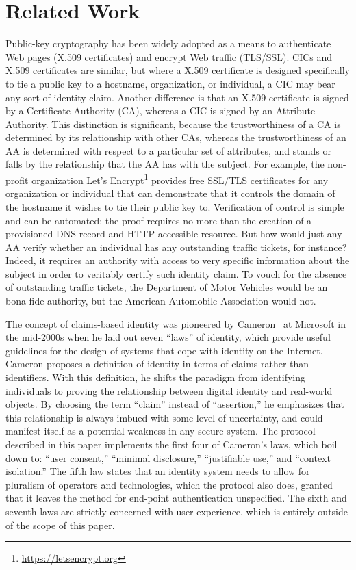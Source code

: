 \documentclass[conference]{IEEEtran}
\begin{document}
\section{Related Work}
Public-key cryptography has been widely adopted as a means to authenticate Web pages (X.509 certificates) and encrypt Web traffic (TLS/SSL). CICs and X.509 certificates are similar, but where a X.509 certificate is designed specifically to tie a public key to a hostname, organization, or individual, a CIC may bear any sort of identity claim. Another difference is that an X.509 certificate is signed by a Certificate Authority (CA), whereas a CIC is signed by an Attribute Authority. This distinction is significant, because the trustworthiness of a CA is determined by its relationship with other CAs, whereas the trustworthiness of an AA is determined with respect to a particular set of attributes, and stands or falls by the relationship that the AA has with the subject.
For example, the non-profit organization Let's Encrypt\footnote{\url{https://letsencrypt.org}} provides free SSL/TLS certificates for any organization or individual that can demonstrate that it controls the domain of the hostname it wishes to tie their public key to. Verification of control is simple and can be automated; the proof requires no more than the creation of a provisioned DNS record and HTTP-accessible resource. But how would just any AA verify whether an individual has any outstanding traffic tickets, for instance? Indeed, it requires an authority with access to very specific information about the subject in order to veritably certify such identity claim. To vouch for the absence of outstanding traffic tickets, the Department of Motor Vehicles would be an bona fide authority, but the American Automobile Association would not.

The concept of claims-based identity was pioneered by Cameron~\cite{cameron2005laws} at Microsoft in the mid-2000s when he laid out seven ``laws'' of identity, which provide useful guidelines for the design of systems that cope with identity on the Internet. Cameron proposes a definition of identity in terms of claims rather than identifiers. With this definition, he shifts the paradigm from identifying individuals to proving the relationship between digital identity and real-world objects. By choosing the term ``claim'' instead of ``assertion,'' he emphasizes that this relationship is always imbued with some level of uncertainty, and could manifest itself as a potential weakness in any secure system. The protocol described in this paper implements the first four of Cameron's laws, which boil down to: ``user consent,'' ``minimal disclosure,'' ``justifiable use,'' and ``context isolation.'' The fifth law states that an identity system needs to allow for pluralism of operators and technologies, which the protocol also does, granted that it leaves the method for end-point authentication unspecified. The sixth and seventh laws are strictly concerned with user experience, which is entirely outside of the scope of this paper.
\end{document}
